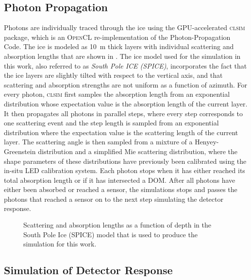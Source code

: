 \subsection{Photon Propagation}
\label{sec:photon-propagation}

Photons are individually traced through the ice using the GPU-accelerated \textsc{clsim}\cite{clsim} package, which is an \textsc{OpenCL} re-implementation of the Photon-Propagation Code.
 The ice is modeled as 10~m thick layers with individual scattering and absorption lengths that are shown in .
The ice model used for the simulation in this work, also referred to as \emph{South Pole ICE (SPICE)}, incorporates the fact that the ice layers are slightly tilted with respect to the vertical axis, and that scattering and absorption strengths are not uniform as a function of azimuth.
For every photon, \textsc{clsim} first samples the absorption length from an exponential distribution whose expectation value is the absorption length of the current layer.
It then propagates all photons in parallel steps, where every step corresponds to one scattering event and the step length is sampled from an exponential distribution where the expectation value is the scattering length of the current layer.
The scattering angle is then sampled from a mixture of a Henyey-Greenstein distribution and a simplified Mie scattering distribution, where the shape parameters of these distributions have previously been calibrated using the in-situ LED calibration system\cite{flasher_calibration}.
Each photon stops when it has either reached its total absorption length or if it has intersected a DOM.
After all photons have either been absorbed or reached a sensor, the simulations stops and passes the photons that reached a sensor on to the next step simulating the detector response.

\begin{figure}
    \centering
    
    \caption{Scattering and absorption lengths as a function of depth in the South Pole Ice (SPICE) model that is used to produce the simulation for this work.}
    \label{fig:spice-model}
\end{figure}


\subsection{Simulation of Detector Response}

